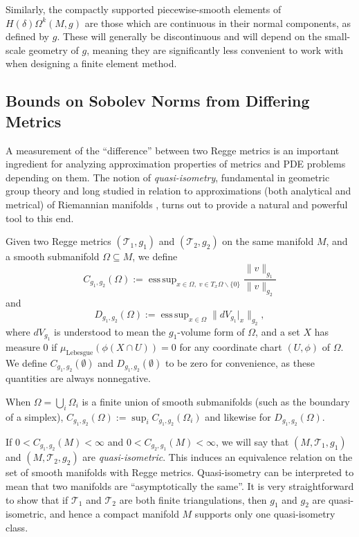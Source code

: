 \documentclass[11pt]{article}
\DeclareMathOperator*{\esssup}{ess\,sup}
\begin{document}
Similarly, the compactly supported piecewise-smooth elements of $H(\delta)\Omega^k(M,g)$ are those which are continuous in their normal components, as defined by $g$. These will generally be discontinuous and will depend on the small-scale geometry of $g$, meaning they are significantly less convenient to work with when designing a finite element method.

\subsection{Bounds on Sobolev Norms from Differing Metrics} \label{sec:bounds}

A measurement of the ``difference'' between two Regge metrics is an important ingredient for analyzing approximation properties of metrics and PDE problems depending on them. The notion of \emph{quasi-isometry}, fundamental in geometric group theory \cite{Gromov} and long studied in relation to approximations (both analytical and metrical) of Riemannian manifolds \cite{Kanai}, turns out to provide a natural and powerful tool to this end. 

Given two Regge metrics $(\mathcal{T}_1,g_1)$ and $(\mathcal{T}_2,g_2)$ on the same manifold $M$, and a smooth submanifold $\Omega \subseteq M$, we define
\begin{equation}
C_{g_1,g_2}(\Omega) := \esssup_{x \in \Omega, \; v \in T_x\Omega \backslash \{0\}} \frac{\|v\|_{g_1}}{\|v\|_{g_2}}
\end{equation}
and
\begin{equation}
D_{g_1,g_2}(\Omega) := \esssup_{x \in \Omega} \|dV_{g_1}|_x\|_{g_2},
\end{equation}
where $dV_{g_1}$ is understood to mean the $g_1$-volume form of $\Omega$, and a set $X$ has measure 0  if $\mu_\mathrm{Lebesgue}(\phi(X \cap U)) = 0$ for any coordinate chart $(U,\phi)$ of $\Omega$. We define $C_{g_1,g_2}(\emptyset)$ and $D_{g_1,g_2}(\emptyset)$ to be zero for convenience, as these quantities are always nonnegative.

When $\Omega = \bigcup_i \Omega_i$ is a finite union of smooth submanifolds (such as the boundary of a simplex), $C_{g_1,g_2}(\Omega) := \sup_i C_{g_1,g_2}(\Omega_i)$ and likewise for $D_{g_1,g_2}(\Omega)$.

If $0 < C_{g_1,g_2}(M) < \infty$ and $0 < C_{g_2,g_1}(M) < \infty$, we will say that $(M,\mathcal{T}_1,g_1)$ and $(M,\mathcal{T}_2,g_2)$ are \emph{quasi-isometric}. This induces an equivalence relation on the set of smooth manifolds with Regge metrics. Quasi-isometry can be interpreted to mean that two manifolds are ``asymptotically the same''. It is very straightforward to show that if $\mathcal{T}_1$ and $\mathcal{T}_2$ are both finite triangulations, then $g_1$ and $g_2$ are quasi-isometric, and hence a compact manifold $M$ supports only one quasi-isometry class.
\end{document}
